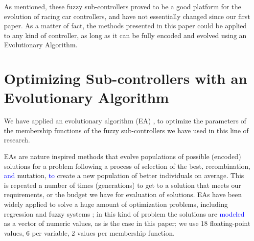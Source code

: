 \documentclass[10pt,journal,compsoc]{IEEEtran}
\begin{document}
As mentioned, these fuzzy sub-controllers proved to be a good platform for the evolution of racing car controllers, and have not essentially changed since our first paper. As a matter of fact, the methods presented in this paper could
be applied to any kind of controller, as long as it can be fully
encoded and evolved using an Evolutionary Algorithm. 

\section{Optimizing Sub-controllers with an Evolutionary Algorithm}
\label{sec:ga}

We have applied an evolutionary algorithm (EA) \cite{EAs_Back96}, to optimize the parameters of the membership functions of the fuzzy sub-controllers we have used in this line of research.

EAs are nature inspired methods that evolve populations of possible (encoded) solutions for a problem following a process of selection of the best,
recombination, \textcolor{blue}{and} mutation, \textcolor{blue}{to} create a new population of better individuals on average. This is repeated a number of times
(generations) to get to a solution that meets our requirements, or the
budget we have for evaluation of solutions. EAs have been widely
applied to solve a huge amount of optimization problems, including regression and fuzzy systems \cite{hoffmann2001evolutionary}; in this kind of problem the solutions are \textcolor{blue}{modeled} as a vector of numeric values, as is the
case in this paper; we use 18 floating-point values, 6 per variable, 2 values per membership function.




\end{document}
